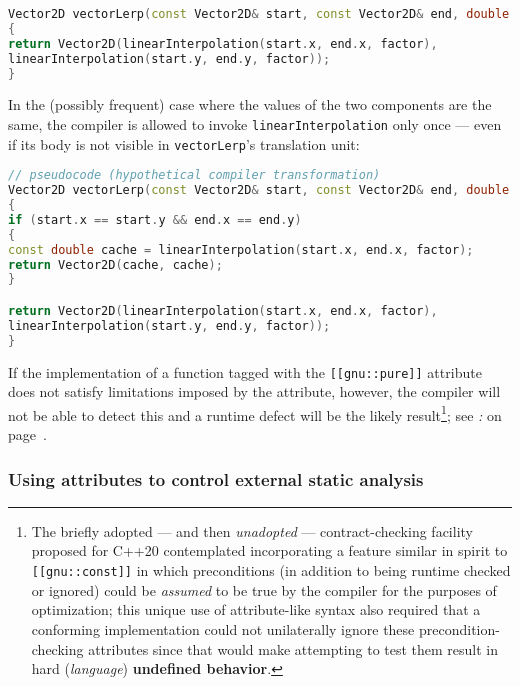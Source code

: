 \begin{lstlisting}[language=C++]
Vector2D vectorLerp(const Vector2D& start, const Vector2D& end, double factor)
{
return Vector2D(linearInterpolation(start.x, end.x, factor),
linearInterpolation(start.y, end.y, factor));
}
\end{lstlisting}

\noindent In the (possibly frequent) case where the values of the two components
are the same, the compiler is allowed to invoke
\texttt{linearInterpolation} only once --- even if its body is not
visible in \texttt{vectorLerp}'s translation unit:

\begin{lstlisting}[language=C++]
// pseudocode (hypothetical compiler transformation)
Vector2D vectorLerp(const Vector2D& start, const Vector2D& end, double factor)
{
if (start.x == start.y && end.x == end.y)
{
const double cache = linearInterpolation(start.x, end.x, factor);
return Vector2D(cache, cache);
}

return Vector2D(linearInterpolation(start.x, end.x, factor),
linearInterpolation(start.y, end.y, factor));
}
\end{lstlisting}

\noindent If the implementation of a function tagged with the
\texttt{[[gnu::pure]]} attribute does not satisfy limitations imposed by
the attribute, however, the compiler will not be able to detect this and a runtime
defect will be the likely result{\cprotect\footnote{The briefly adopted
--- and then \emph{unadopted} --- contract-checking facility proposed
for C++20 contemplated incorporating a feature similar in spirit to
\texttt{[[gnu::const]]} in which preconditions (in addition to being
runtime checked or ignored) could be \emph{assumed} to be true by the
compiler for the purposes of optimization; this unique use of
attribute-like syntax also required that a conforming implementation
could not unilaterally ignore these precondition-checking attributes
since that would make attempting to test them result in hard
(\emph{language}) \textbf{undefined behavior}.}}; see
{\it{}:} {\it{}} on page~\pageref{some-attributes,-if-misused,-can-affect-program-correctness}.

\subsubsection[Using attributes to control external static analysis]{Using attributes to control external static analysis}\label{using-attributes-to-control-external-static-analysis}


